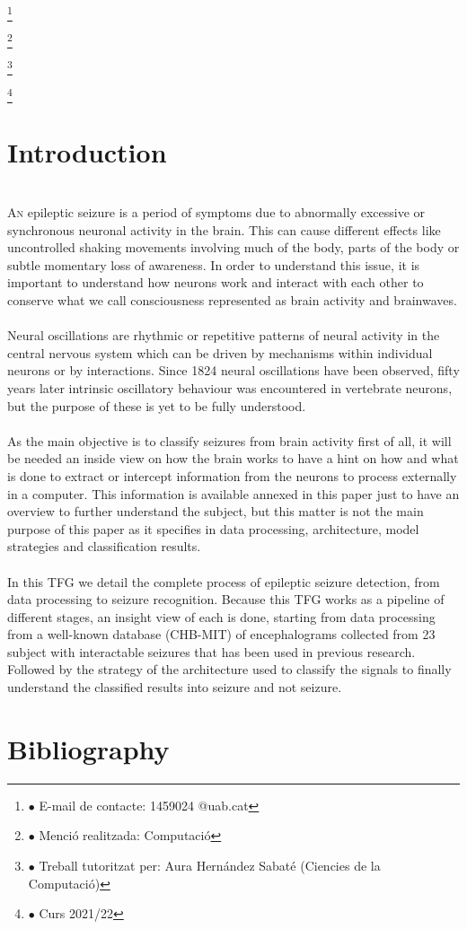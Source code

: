 ﻿\documentclass[10pt,a4paper,twocolumn,twoside]{article}
\newcommand\blfootnote[1]{%
  \begingroup
  \renewcommand\thefootnote{}\footnote{#1}%
  \addtocounter{footnote}{-1}%
  \endgroup
}
\begin{document}
\blfootnote{$\bullet$ E-mail de contacte: 1459024 @uab.cat}
\blfootnote{$\bullet$ Menció realitzada: Computació }
\blfootnote{$\bullet$ Treball tutoritzat per: Aura Hernández Sabaté (Ciencies de la Computació)}
\blfootnote{$\bullet$ Curs 2021/22}

\section{Introduction}
\leavevmode\\
\lettrine[lines=3]{A}{n} epileptic seizure is a period of symptoms due to abnormally excessive or synchronous neuronal activity in the brain. This can cause different effects like uncontrolled shaking movements involving much of the body, parts of the body or subtle momentary loss of awareness. In order to understand this issue, it is important to understand how neurons work and interact with each other to conserve what we call consciousness represented as brain activity and brainwaves. 
\\\\
Neural oscillations are rhythmic or repetitive patterns of neural activity in the central nervous system which can be driven by mechanisms within individual neurons or by interactions. Since 1824 neural oscillations have been observed, fifty years later intrinsic oscillatory behaviour was encountered in vertebrate neurons, but the purpose of these is yet to be fully understood.
\\\\
As the main objective is to classify seizures from brain activity first of all, it will be needed an inside view on how the brain works to have a hint on how and what is done to extract or intercept information from the neurons to process externally in a computer. This information is available annexed in this paper just to have an overview to further understand the subject, but this matter is not the main purpose of this paper as it specifies in data processing, architecture, model strategies and classification results.
\\\\
In this TFG we detail the complete process of epileptic seizure detection, from data processing to seizure recognition. Because this TFG works as a pipeline of different stages, an insight view of each is done, starting from data processing from a well-known database (CHB-MIT) of encephalograms collected from 23 subject with interactable seizures that has been used in previous research. Followed by the strategy of the architecture used to classify the signals to finally understand the classified results into seizure and not seizure.
\\







\section{Bibliography}
\label{sec-bibliography}

\printbibliography



\end{document}
